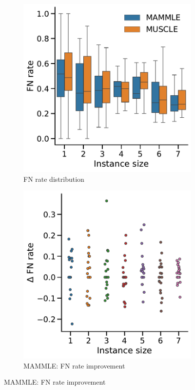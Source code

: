 \begin{figure}[!htbp]%
	\begin{adjustwidth}{-1.1cm}{}
		\centering
		\begin{subfigure}{0.50\textwidth} \includegraphics[width=\textwidth]{Figure/comparison-ast} \caption{FN rate distribution} \label{fig:boxplot-ast} \end{subfigure}
		\begin{subfigure}{0.50\textwidth} \includegraphics[width=\textwidth]{Figure/delta4-ast} \caption{MAMMLE: FN rate improvement}\label{fig:scatter-ast}\end{subfigure}

\end{adjustwidth}
\end{figure}
